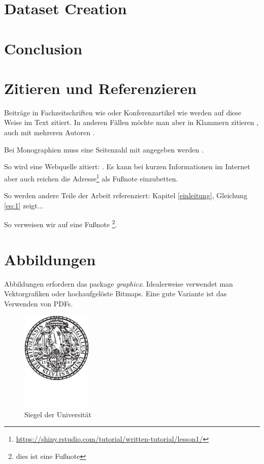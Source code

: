\documentclass[12pt,oneside]{article}
\begin{document}
\section{Dataset Creation}

\section{Conclusion}

\section{Zitieren und Referenzieren}

Beiträge in Fachzeitschriften wie \citet{clemen1989combining} oder Konferenzartikel wie \citet{he2017mask} werden auf diese Weise im Text zitiert. In anderen Fällen möchte man aber in Klammern zitieren \citep{clemen1989combining}, auch mit mehreren Autoren \citep{clemen1989combining,baumol1958warehouse,he2017mask}.

Bei Monographien muss eine Seitenzahl mit angegeben werden \citep[S. 28]{chollet2018deep}.

So wird eine Webquelle zitiert: \citet{shiny1}. Es kann bei kurzen Informationen im Internet aber auch reichen die Adresse\footnote{\url{https://shiny.rstudio.com/tutorial/written-tutorial/lesson1/}} als Fußnote einzubetten.

So werden andere Teile der Arbeit referenziert: Kapitel \ref{einleitung}, Gleichung \ref{eq:1} zeigt...

So verweisen wir auf eine Fußnote \footnote{dies ist eine Fußnote}.

\section{Abbildungen}

Abbildungen erfordern das package \textit{graphicx}. 
Idealerweise verwendet man Vektorgrafiken oder hochaufgelöste Bitmaps. 
Eine gute Variante ist das Verwenden von PDFs.

\begin{figure}[h]
    \centering
    \includegraphics[width=0.3\textwidth]{siegel.pdf}
    \caption{Siegel der Universität}
    \label{fig:my_label}
\end{figure}
\end{document}

